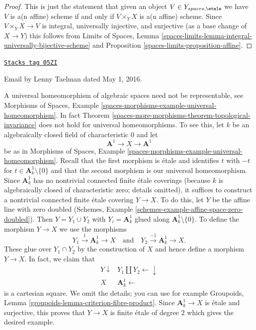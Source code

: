 \begin{proof}
This is just the statement that given an object
$V \in Y_{spaces, \etale}$ we have $V$ is a(n affine) scheme if and
only if $V \times_Y X$ is a(n affine) scheme. Since $V \times_Y X \to V$
is integral, universally injective, and surjective (as a base
change of $X \to Y$) this
follows from Limits of Spaces, Lemma
\ref{spaces-limits-lemma-integral-universally-bijective-scheme} and
Proposition \ref{spaces-limits-proposition-affine}.
\end{proof}

\begin{remark}
\label{spaces-more-morphisms-remark-topological-invariance-etale-site}
\href{https://stacks.math.columbia.edu/tag/05ZI}{\texttt{Stacks tag 05ZI}}

\begin{reference}
Email by Lenny Taelman dated May 1, 2016.
\end{reference}
A universal homeomorphism of algebraic spaces need not be representable, see
Morphisms of Spaces,
Example \ref{spaces-morphisms-example-universal-homeomorphism}.
In fact Theorem \ref{spaces-more-morphisms-theorem-topological-invariance} does
not hold for universal homeomorphisms. To see this, let $k$ be an
algebraically closed field of characteristic $0$ and let
$$
\mathbf{A}^1 \to X \to \mathbf{A}^1
$$
be as in Morphisms of Spaces,
Example \ref{spaces-morphisms-example-universal-homeomorphism}.
Recall that the first morphism is \'etale and identifies
$t$ with $-t$ for $t \in \mathbf{A}^1_k \setminus \{0\}$
and that the second morphism is our universal homeomorphism.
Since $\mathbf{A}^1_k$ has no
nontrivial connected finite \'etale coverings
(because $k$ is algebraically closed of characteristic zero; details omitted),
it suffices to construct a nontrivial connected finite \'etale covering
$Y \to X$. To do this, let $Y$ be the affine line
with zero doubled
(Schemes, Example \ref{schemes-example-affine-space-zero-doubled}).
Then $Y = Y_1 \cup Y_2$ with $Y_i = \mathbf{A}^1_k$ glued
along $\mathbf{A}^1_k \setminus \{0\}$.
To define the morphism $Y \to X$ we use the morphisms
$$
Y_1 \xrightarrow{1} \mathbf{A}^1_k \to X
\quad\text{and}\quad
Y_2 \xrightarrow{-1} \mathbf{A}^1_k \to X.
$$
These glue over $Y_1 \cap Y_2$ by the construction of $X$ and
hence define a morphism $Y \to X$. In fact, we claim that
$$
\begin{array}{cc}Y \downarrow & Y_1 \amalg Y_2 \longleftarrow\downarrow \\ X & \mathbf{A}^1_k \longleftarrow\end{array}
$$
is a cartesian square. We omit the details; you can use for example
Groupoids, Lemma \ref{groupoids-lemma-criterion-fibre-product}.
Since $\mathbf{A}^1_k \to X$ is \'etale and
surjective, this proves that $Y \to X$
is finite \'etale of degree $2$ which gives the desired example.


\end{remark}
